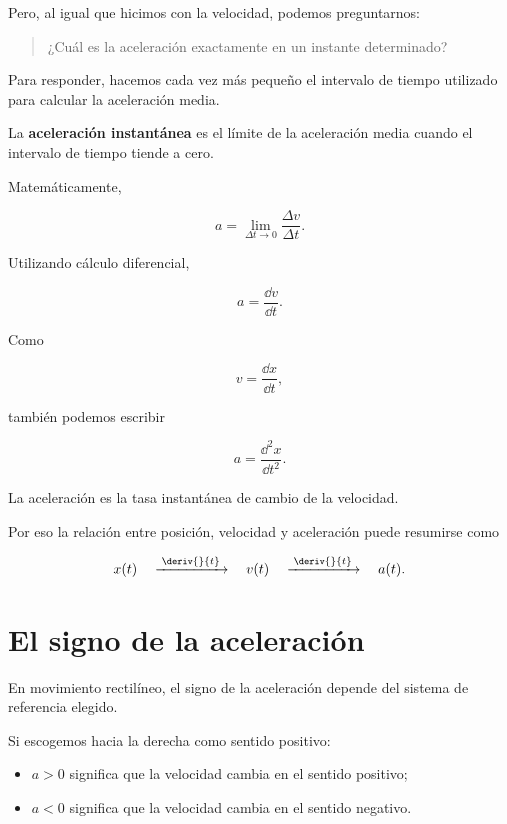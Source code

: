 Pero, al igual que hicimos con la velocidad, podemos preguntarnos:

\begin{quote}
¿Cuál es la aceleración exactamente en un instante determinado?
\end{quote}

Para responder, hacemos cada vez más pequeño el intervalo de tiempo utilizado
para calcular la aceleración media.

\begin{definicion}
La \textbf{aceleración instantánea} es el límite de la aceleración media
cuando el intervalo de tiempo tiende a cero.
\end{definicion}

Matemáticamente,

\[ \boxed{a=\lim_{\Delta t\to0}\frac{\Delta v}{\Delta t}}. \]

Utilizando cálculo diferencial,

\[ \boxed{a=\frac{\dd v}{\dd t}}. \]

Como

\[ v=\frac{\dd x}{\dd t}, \]

también podemos escribir

\[ \boxed{a=\frac{\dd^2x}{\dd t^2}}. \]

\begin{interpretacion}
La aceleración es la tasa instantánea de cambio de la velocidad.

Por eso la relación entre posición, velocidad y aceleración puede resumirse
como

\[
x(t)
\quad
\xrightarrow{\;\deriv{}{t}\;}
\quad
v(t)
\quad
\xrightarrow{\;\deriv{}{t}\;}
\quad
a(t).
\]
\end{interpretacion}


\section{El signo de la aceleración}

En movimiento rectilíneo, el signo de la aceleración depende del sistema de
referencia elegido.

Si escogemos hacia la derecha como sentido positivo:

\begin{itemize}
    \item \(a>0\) significa que la velocidad cambia en el sentido positivo;
    \item \(a<0\) significa que la velocidad cambia en el sentido negativo.
\end{itemize}

